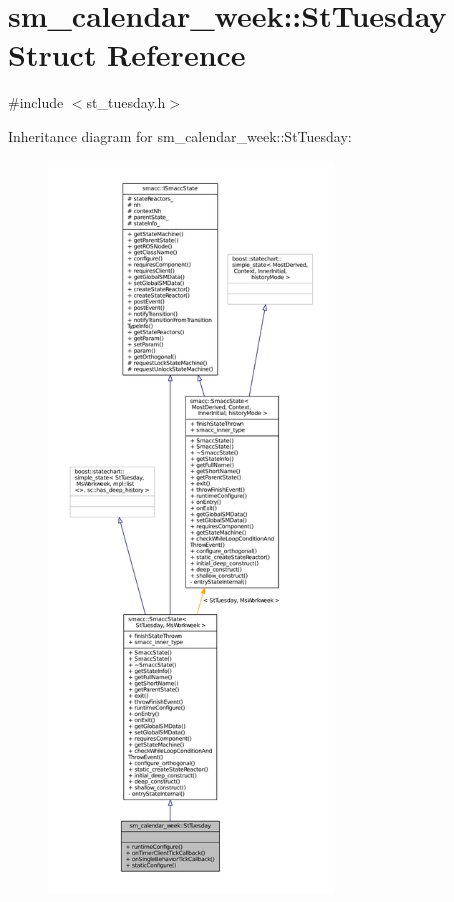 \hypertarget{structsm__calendar__week_1_1StTuesday}{}\section{sm\+\_\+calendar\+\_\+week\+:\+:St\+Tuesday Struct Reference}
\label{structsm__calendar__week_1_1StTuesday}


{\ttfamily \#include $<$st\+\_\+tuesday.\+h$>$}



Inheritance diagram for sm\+\_\+calendar\+\_\+week\+:\+:St\+Tuesday\+:
\nopagebreak
\begin{figure}[H]
\begin{center}
\leavevmode
\includegraphics[height=550pt]{structsm__calendar__week_1_1StTuesday__inherit__graph}
\end{center}
\end{figure}



